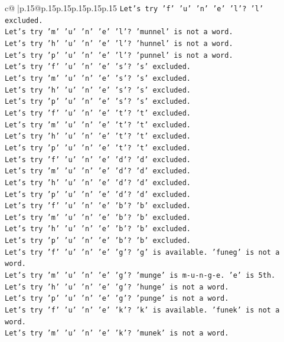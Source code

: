 \documentclass{article}
\begin{document}
{\begin{supertabular}{c@{$\;$}|p{.15\linewidth}@{}p{.15\linewidth}p{.15\linewidth}p{.15\linewidth}p{.15\linewidth}p{.15\linewidth}}
{{{\texttt{Let's try 'f' 'u' 'n' 'e' 'l'? 'l' excluded.} \\
\texttt{Let's try 'm' 'u' 'n' 'e' 'l'? 'munnel' is not a word.} \\
\texttt{Let's try 'h' 'u' 'n' 'e' 'l'? 'hunnel' is not a word.} \\
\texttt{Let's try 'p' 'u' 'n' 'e' 'l'? 'punnel' is not a word.} \\
\texttt{Let's try 'f' 'u' 'n' 'e' 's'? 's' excluded.} \\
\texttt{Let's try 'm' 'u' 'n' 'e' 's'? 's' excluded.} \\
\texttt{Let's try 'h' 'u' 'n' 'e' 's'? 's' excluded.} \\
\texttt{Let's try 'p' 'u' 'n' 'e' 's'? 's' excluded.} \\
\texttt{Let's try 'f' 'u' 'n' 'e' 't'? 't' excluded.} \\
\texttt{Let's try 'm' 'u' 'n' 'e' 't'? 't' excluded.} \\
\texttt{Let's try 'h' 'u' 'n' 'e' 't'? 't' excluded.} \\
\texttt{Let's try 'p' 'u' 'n' 'e' 't'? 't' excluded.} \\
\texttt{Let's try 'f' 'u' 'n' 'e' 'd'? 'd' excluded.} \\
\texttt{Let's try 'm' 'u' 'n' 'e' 'd'? 'd' excluded.} \\
\texttt{Let's try 'h' 'u' 'n' 'e' 'd'? 'd' excluded.} \\
\texttt{Let's try 'p' 'u' 'n' 'e' 'd'? 'd' excluded.} \\
\texttt{Let's try 'f' 'u' 'n' 'e' 'b'? 'b' excluded.} \\
\texttt{Let's try 'm' 'u' 'n' 'e' 'b'? 'b' excluded.} \\
\texttt{Let's try 'h' 'u' 'n' 'e' 'b'? 'b' excluded.} \\
\texttt{Let's try 'p' 'u' 'n' 'e' 'b'? 'b' excluded.} \\
\texttt{Let's try 'f' 'u' 'n' 'e' 'g'? 'g' is available. 'funeg' is not a word.} \\
\texttt{Let's try 'm' 'u' 'n' 'e' 'g'? 'munge' is m{-}u{-}n{-}g{-}e. 'e' is 5th.} \\
\texttt{Let's try 'h' 'u' 'n' 'e' 'g'? 'hunge' is not a word.} \\
\texttt{Let's try 'p' 'u' 'n' 'e' 'g'? 'punge' is not a word.} \\
\texttt{Let's try 'f' 'u' 'n' 'e' 'k'? 'k' is available. 'funek' is not a word.} \\
\texttt{Let's try 'm' 'u' 'n' 'e' 'k'? 'munek' is not a word.} \\
}}}
\end{supertabular}}
\end{document}
